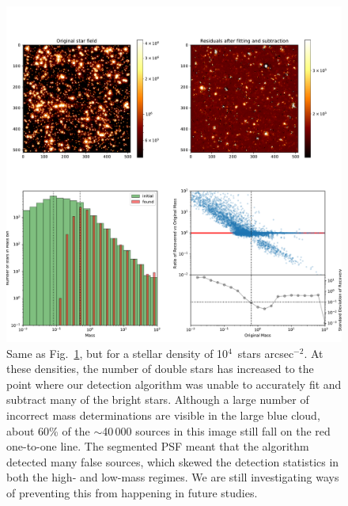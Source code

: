 \documentclass[referee]{aa}
\newcommand{\s}{$\sim$}
\newcommand{\h}[1]{$^{#1}$}
\newcommand{\spae}{stars arcsec$^{-2}$}
\begin{document}
\begin{appendix}
\begin{figure}
    \label{fig:results_lmc_1E3}
\end{figure}


\begin{figure}

    \centering
    \includegraphics[width=\textwidth]{tbl_stats_dist=50000_rho=10000.pdf}
    \caption{Same as Fig.~\ref{fig:results_lmc_1E3}, but for a stellar density of 10\h4~\spae.
    At these densities, the number of double stars has increased to the point where our detection algorithm was unable to accurately fit and subtract many of the bright stars.
    Although a large number of incorrect mass determinations are visible in the large blue cloud, about 60\% of the \s40\,000 sources in this image still fall on the red one-to-one line.
    The segmented PSF meant that the algorithm detected many false sources, which skewed the detection statistics in both the high- and low-mass regimes.
    We are still investigating ways of preventing this from happening in future studies.}

    \label{fig:results_lmc_1E4}

\end{figure}

\end{appendix}




\end{document}
